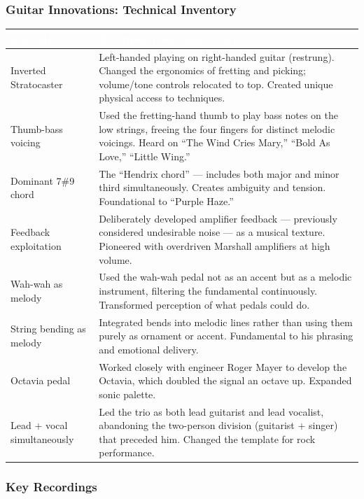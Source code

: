\documentclass[11pt,letterpaper]{article}
\newcommand{\tableheader}[1]{\textbf{\sffamily\textcolor{white}{#1}}}
\begin{document}
\subsubsection{Guitar Innovations: Technical Inventory}

\begin{center}
\begin{tabularx}{\textwidth}{L{3.5cm}X}
\toprule
{}
\tableheader{Innovation} & \tableheader{Description and Significance} \\
\midrule
Inverted Stratocaster & Left-handed playing on right-handed guitar (restrung). Changed the ergonomics of fretting and picking; volume/tone controls relocated to top. Created unique physical access to techniques. \\
Thumb-bass voicing & Used the fretting-hand thumb to play bass notes on the low strings, freeing the four fingers for distinct melodic voicings. Heard on ``The Wind Cries Mary,'' ``Bold As Love,'' ``Little Wing.'' \\
Dominant 7\#9 chord & The ``Hendrix chord'' --- includes both major and minor third simultaneously. Creates ambiguity and tension. Foundational to ``Purple Haze.'' \\
Feedback exploitation & Deliberately developed amplifier feedback --- previously considered undesirable noise --- as a musical texture. Pioneered with overdriven Marshall amplifiers at high volume. \\
Wah-wah as melody & Used the wah-wah pedal not as an accent but as a melodic instrument, filtering the fundamental continuously. Transformed perception of what pedals could do. \\
String bending as melody & Integrated bends into melodic lines rather than using them purely as ornament or accent. Fundamental to his phrasing and emotional delivery. \\
Octavia pedal & Worked closely with engineer Roger Mayer to develop the Octavia, which doubled the signal an octave up. Expanded sonic palette. \\
Lead + vocal simultaneously & Led the trio as both lead guitarist and lead vocalist, abandoning the two-person division (guitarist + singer) that preceded him. Changed the template for rock performance. \\
\bottomrule
\end{tabularx}
\end{center}

\subsubsection{Key Recordings}
\end{document}
